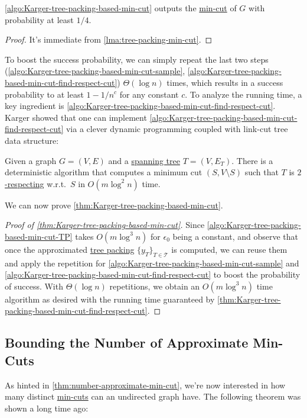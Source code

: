 \begin{lemma}
	\autoref{algo:Karger-tree-packing-based-min-cut} outputs the \hyperref[prb:global-min-cut]{min-cut} of \(G\) with probability at least \(1 / 4\).
\end{lemma}
\begin{proof}
	It's immediate from \autoref{lma:tree-packing-min-cut}.
\end{proof}

To boost the success probability, we can simply repeat the last two steps (\autoref{algo:Karger-tree-packing-based-min-cut-sample}, \autoref{algo:Karger-tree-packing-based-min-cut-find-respect-cut}) \(\Theta (\log n)\) times, which results in a success probability to at least \(1 - 1 / n^c\) for any constant \(c\). To analyze the running time, a key ingredient is \autoref{algo:Karger-tree-packing-based-min-cut-find-respect-cut}. Karger showed that one can implement \autoref{algo:Karger-tree-packing-based-min-cut-find-respect-cut} via a clever dynamic programming coupled with link-cut tree data structure:

\begin{theorem}\label{thm:Karger-tree-packing-based-min-cut-find-respect-cut}
	Given a graph \(G = (V, E)\) and a \hyperref[def:spanning-tree]{spanning tree} \(T = (V, E_T)\). There is a deterministic algorithm that computes a minimum cut \((S, V \setminus S)\) such that \(T\) is \hyperref[def:respect]{\(2\)-respecting} w.r.t.\ \(S\) in \(O(m \log ^2 n)\) time.
\end{theorem}

We can now prove \autoref{thm:Karger-tree-packing-based-min-cut}.

\begin{proof}[Proof of \autoref{thm:Karger-tree-packing-based-min-cut}]
	Since \autoref{algo:Karger-tree-packing-based-min-cut-TP} takes \(O(m \log ^3 n)\) for \(\epsilon _0\) being a constant, and observe that once the approximated \hyperref[prb:TP]{tree packing} \(\{ y_T \} _{T \in \mathcal{T} }\) is computed, we can reuse them and apply the repetition for \autoref{algo:Karger-tree-packing-based-min-cut-sample} and \autoref{algo:Karger-tree-packing-based-min-cut-find-respect-cut} to boost the probability of success. With \(\Theta (\log n)\) repetitions, we obtain an \(O(m \log ^3 n)\) time algorithm as desired with the running time guaranteed by \autoref{thm:Karger-tree-packing-based-min-cut-find-respect-cut}.
\end{proof}

\subsection{Bounding the Number of Approximate Min-Cuts}
As hinted in \autoref{thm:number-approximate-min-cut}, we're now interested in how many distinct \hyperref[prb:global-min-cut]{min-cuts} can an undirected graph have. The following theorem was shown a long time ago:

